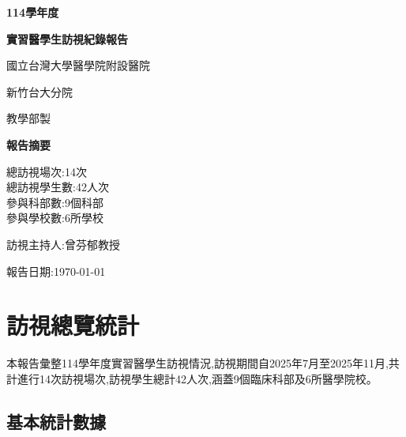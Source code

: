 \documentclass[12pt,a4paper]{article}
\newcommand{\mydate}{\today}
\begin{document}
\begin{titlepage}
    \centering
    \vspace*{2cm}
    
    {\Huge\bfseries\color{emergency_red} 114學年度\par}
    \vspace{0.5cm}
    {\Huge\bfseries\color{emergency_red} 實習醫學生訪視紀錄報告\par}
    \vspace{2cm}
    
    {\Large\color{emergency_blue} 國立台灣大學醫學院附設醫院\par}
    {\Large\color{emergency_blue} 新竹台大分院\par}
    \vspace{1cm}
    
    {\large 教學部製\par}
    \vspace{2cm}
    
    \begin{importantbox}
    \centering
    {\large\bfseries 報告摘要}
    \vspace{0.5cm}
    
    總訪視場次:14次 \\
    總訪視學生數:42人次\\
    參與科部數:9個科部 \\ 
    參與學校數:6所學校 \\
    \end{importantbox}
    
    \vfill
    
    {\large 訪視主持人:曾芬郁教授\par}
    \vspace{0.5cm}
    {\large 報告日期:\mydate\par}
\end{titlepage}

\newpage
\tableofcontents
\newpage

\section{訪視總覽統計}

本報告彙整114學年度實習醫學生訪視情況,訪視期間自2025年7月至2025年11月,共計進行14次訪視場次,訪視學生總計42人次,涵蓋9個臨床科部及6所醫學院校。

\subsection{基本統計數據}
\end{document}
